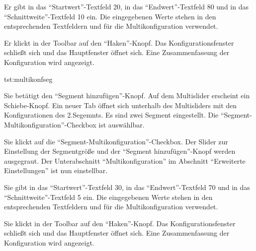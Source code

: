 \documentclass[parskip=full,11pt]{scrartcl}
\begin{document}
{Er gibt in das \enquote{Startwert}-Textfeld 20, in das \enquote{Endwert}-Textfeld 80 und in das \enquote{Schnittweite}-Textfeld 10 ein.}
{Die eingegebenen Werte stehen in den entsprechenden Textfeldern und für die Multikonfiguration verwendet.}

{Er klickt in der Toolbar auf den \enquote{Haken}-Knopf.}
{Das Konfigurationsfenster schließt sich und das Hauptfenster öffnet sich. Eine Zusammenfassung der Konfiguration wird angezeigt.}

{tst:multikonfseg}

{Sie betätigt den \enquote{Segment hinzufügen}-Knopf.}
{Auf dem Multislider erscheint ein Schiebe-Knopf. Ein neuer Tab öffnet sich unterhalb des Multisliders mit den Konfigurationen des 2.Segemnts. Es sind zwei Segment eingestellt. Die \enquote{Segment-Multikonfiguration}-Checkbox ist auswählbar.}

{Sie klickt auf die \enquote{Segment-Multikonfiguration}-Checkbox.}
{Der Slider zur Einstellung der Segmentgröße und der \enquote{Segment hinzufügen}-Knopf werden ausgegraut. Der Unterabschnitt \enquote{Multikonfiguration} im Abschnitt \enquote{Erweiterte Einstellungen} ist nun einstellbar.}

{Sie gibt in das \enquote{Startwert}-Textfeld 30, in das \enquote{Endwert}-Textfeld 70 und in das \enquote{Schnittweite}-Textfeld 5 ein.}
{Die eingegebenen Werte stehen in den entsprechenden Textfeldern und für die Multikonfiguration verwendet.}

{Sie klickt in der Toolbar auf den \enquote{Haken}-Knopf.}
{Das Konfigurationsfenster schließt sich und das Hauptfenster öffnet sich. Eine Zusammenfassung der Konfiguration wird angezeigt.}
\end{document}
